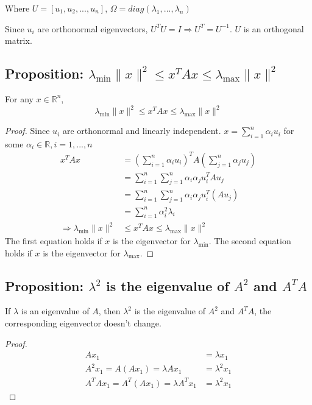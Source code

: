 \documentclass[11pt]{elegantbook}
\begin{document}
Where $U=[u_1,u_2,...,u_n]$, $\Omega=diag(\lambda_1,...,\lambda_n)$

Since $u_i$ are orthonormal eigenvectors, $U^TU=I \Rightarrow U^T=U^{-1}$. $U$ is an orthogonal matrix.

\subsection{Proposition: $\lambda_{\min}\|x\|^2\leq x^TAx\leq \lambda_{\max}\|x\|^2$}
\begin{proposition}
For any $x\in \mathbb{R}^n$, $$\lambda_{\min}\|x\|^2\leq x^TAx\leq \lambda_{\max}\|x\|^2$$
\end{proposition}
\begin{proof}
    Since $u_i$ are orthonormal and linearly independent. $x=\sum_{i=1}^n\alpha_i u_i$ for some $\alpha_i\in \mathbb{R},i=1,...,n$
    \begin{equation}
        \begin{aligned}
            x^TAx&=(\sum_{i=1}^n\alpha_i u_i)^TA(\sum_{j=1}^n\alpha_j u_j)\\
            &=\sum_{i=1}^n\sum_{j=1}^n\alpha_i \alpha_ju_i^TAu_j\\
            &=\sum_{i=1}^n\sum_{j=1}^n\alpha_i \alpha_ju_i^T(Au_j)\\
            &=\sum_{i=1}^n\alpha_i^2\lambda_i\\
            \Rightarrow	\lambda_{\min}\|x\|^2&\leq x^TAx\leq \lambda_{\max}\|x\|^2
        \end{aligned}
        \nonumber
    \end{equation}
    The first equation holds if $x$ is the eigenvector for $\lambda_{\min}$. The second equation holds if $x$ is the eigenvector for $\lambda_{\max}$.
\end{proof}

\subsection{Proposition: $\lambda^2$ is the eigenvalue of $A^2$ and $A^TA$}
\begin{proposition}
If $\lambda$ is an eigenvalue of $A$, then $\lambda^2$ is the eigenvalue of $A^2$ and $ A^TA$, the corresponding eigenvector doesn't change.
\end{proposition}
\begin{proof}
\begin{equation}
    \begin{aligned}
        Ax_1&=\lambda x_1\\
        A^2x_1=A(Ax_1)=\lambda Ax_1&=\lambda^2 x_1\\
        A^TAx_1=A^T(Ax_1)=\lambda A^Tx_1&=\lambda^2x_1
    \end{aligned}
    \nonumber
\end{equation}
\end{proof}
\end{document}
